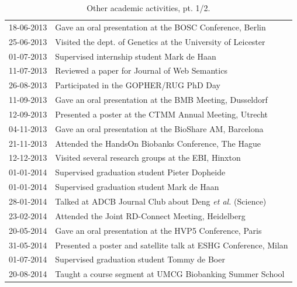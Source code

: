 \begin{appendices}
\begin{table}
\begin{tabulary}{\linewidth}{LL}
			\rule{0pt}{2.5ex}\mbox{18-06-2013} & Gave an oral presentation at the BOSC Conference, Berlin \\
			\rule{0pt}{2.5ex}\mbox{25-06-2013} & Visited the dept. of Genetics at the University of Leicester \\
			\rule{0pt}{2.5ex}\mbox{01-07-2013} & Supervised internship student Mark de Haan \\
			\rule{0pt}{2.5ex}\mbox{11-07-2013} & Reviewed a paper for Journal of Web Semantics \\
			\rule{0pt}{2.5ex}\mbox{26-08-2013} & Participated in the GOPHER/RUG PhD Day \\
			\rule{0pt}{2.5ex}\mbox{11-09-2013} & Gave an oral presentation at the BMB Meeting, Dusseldorf \\
			\rule{0pt}{2.5ex}\mbox{12-09-2013} & Presented a poster at the CTMM Annual Meeting, Utrecht \\
			\rule{0pt}{2.5ex}\mbox{04-11-2013} & Gave an oral presentation at the BioShare AM, Barcelona \\
			\rule{0pt}{2.5ex}\mbox{21-11-2013} & Attended the HandsOn Biobanks Conference, The Hague\\
			\rule{0pt}{2.5ex}\mbox{12-12-2013} & Visited several research groups at the EBI, Hinxton \\
			\rule{0pt}{2.5ex}\mbox{01-01-2014} & Supervised graduation student Pieter Dopheide \\
			\rule{0pt}{2.5ex}\mbox{01-01-2014} & Supervised graduation student Mark de Haan \\
			\rule{0pt}{2.5ex}\mbox{28-01-2014} & Talked at ADCB Journal Club about Deng \textsl{et al.} (Science) \\
			\rule{0pt}{2.5ex}\mbox{23-02-2014} & Attended the Joint RD-Connect Meeting, Heidelberg \\
			\rule{0pt}{2.5ex}\mbox{20-05-2014} & Gave an oral presentation at the HVP5 Conference, Paris \\
			\rule{0pt}{2.5ex}\mbox{31-05-2014} & Presented a poster and satellite talk at ESHG Conference, Milan \\
			\rule{0pt}{2.5ex}\mbox{01-07-2014} & Supervised graduation student Tommy de Boer \\
			\rule{0pt}{2.5ex}\mbox{20-08-2014} & Taught a course segment at UMCG Biobanking Summer School \\
			\hline
		\end{tabulary}
		\caption[Other academic activities, pt. 1/2]{Other academic activities, pt. 1/2.}
		\label{table:appendix_activities_1}
	\end{table}
	

\end{appendices}
